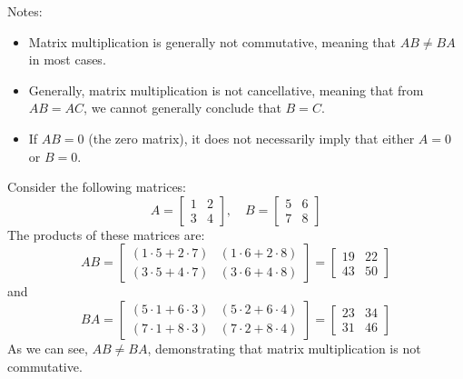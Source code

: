 Notes:
\begin{itemize}[itemsep=1pt,label=$\circ$]
    \item Matrix multiplication is generally not commutative, meaning that \( AB \neq BA \) in most cases.
    \item Generally, matrix multiplication is not cancellative, meaning that from \( AB = AC \), we cannot generally conclude that \( B = C \).
    \item If \( AB = 0 \) (the zero matrix), it does not necessarily imply that either \( A = 0 \) or \( B = 0 \).
\end{itemize}
\begin{eg}
    Consider the following matrices:
    \[
        A = 
        \begin{bmatrix}
            1 & 2 \\
            3 & 4
        \end{bmatrix}
        , \quad
        B = 
        \begin{bmatrix}
            5 & 6 \\
            7 & 8
        \end{bmatrix}
    \]
    The products of these matrices are:
    \[
        AB = 
        \begin{bmatrix}
            (1 \cdot 5 + 2 \cdot 7) & (1 \cdot 6 + 2 \cdot 8) \\
            (3 \cdot 5 + 4 \cdot 7) & (3 \cdot 6 + 4 \cdot 8)
        \end{bmatrix}
        =
        \begin{bmatrix}
            19 & 22 \\
            43 & 50
        \end{bmatrix}
    \]
    and
    \[
        BA = 
        \begin{bmatrix}
            (5 \cdot 1 + 6 \cdot 3) & (5 \cdot 2 + 6 \cdot 4) \\
            (7 \cdot 1 + 8 \cdot 3) & (7 \cdot 2 + 8 \cdot 4)
        \end{bmatrix}
        =
        \begin{bmatrix}
            23 & 34 \\
            31 & 46
        \end{bmatrix}
    \]
    As we can see, \( AB \neq BA \), demonstrating that matrix multiplication is not commutative.
\end{eg}

